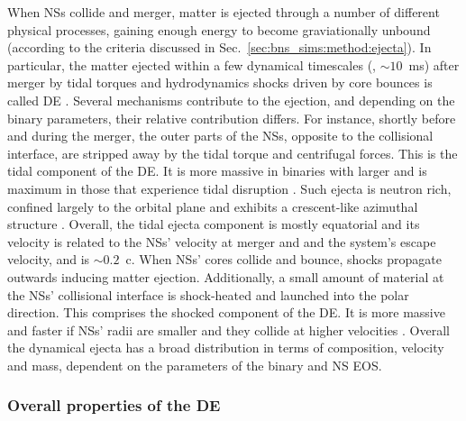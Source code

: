 When \acp{NS} collide and merger, matter is ejected through a number of 
different physical processes, gaining enough energy to become graviationally 
unbound (according to the criteria discussed in Sec.~\ref{sec:bns_sims:method:ejecta}). 
In particular, the matter ejected within a few dynamical timescales (\ie, ${\sim}10$~ms) 
after merger by tidal torques and hydrodynamics shocks driven by core bounces 
is called \ac{DE} \citep[\eg][]{Hotokezaka:2013b,Bauswein:2013yna,Radice:2016dwd,Radice:2018pdn}. 
%
%
Several mechanisms contribute to the ejection, and depending on the 
binary parameters, their relative contribution differs.
%
For instance, shortly before and during the merger, the outer parts 
of the \acp{NS}, opposite to the collisional interface, are stripped 
away by the tidal torque and centrifugal forces. This is the tidal 
component of the \ac{DE}. It is more massive in binaries with 
larger \mr{} and is maximum in those that experience tidal disruption 
\citep[\eg][]{Radice:2018pdn,Bernuzzi:2020txg}.
%
Such ejecta is neutron rich, confined largely to the orbital plane and exhibits 
a crescent-like azimuthal structure \citep{Bernuzzi:2020txg}.
%
Overall, the tidal ejecta component is mostly equatorial and its 
velocity is related to the \acp{NS}' velocity at merger and 
and the system's escape velocity, and is $\sim0.2$~c.
%
When \acp{NS}' cores collide and bounce, shocks propagate outwards inducing 
matter ejection. Additionally, a small amount of material at the 
\acp{NS}' collisional interface is shock-heated and launched into the polar 
direction. This comprises the shocked component of the \ac{DE}.
%
It is more massive and faster if \acp{NS}' radii are smaller and they collide 
at higher velocities \citep[\eg][]{Radice:2018pdn}. 
%
Overall the dynamical ejecta has a broad distribution in terms of composition, 
velocity and mass, dependent on the parameters of the binary and \ac{NS} \ac{EOS}.


\subsubsection{Overall properties of the \ac{DE}}



